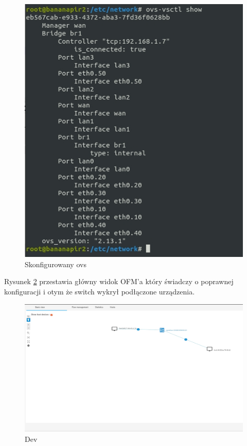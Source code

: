 \documentclass[12pt,a4paper,twoside]{article}
\begin{document}
 \begin{figure}[!h]
	\centering\includegraphics[width=1\textwidth]{ovs_show.jpg}
	\caption{Skonfigurowany ovs}
	\label{ovs}
\end{figure}

\newpage
Rysunek \ref{Dev} przestawia główny widok OFM'a który świadczy o poprawnej konfiguracji i otym że switch wykrył podłączone urządzenia.  


\begin{figure} [!h]
	\centering\includegraphics[width=1\textwidth]{Dev.jpg}
	\caption{Dev}
	\label{Dev}
\end{figure}
\end{document}
